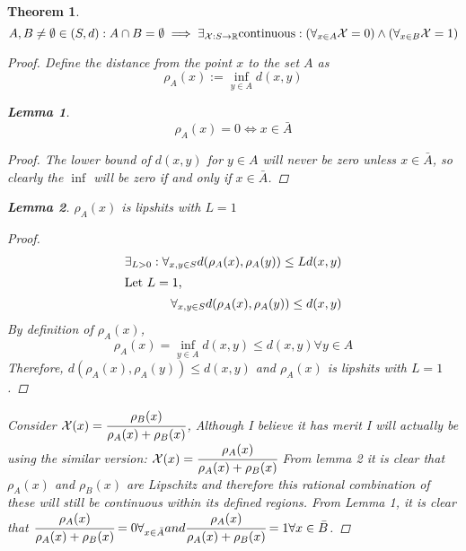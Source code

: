 \documentclass[]{article}
\newcommand{\R}{\mathbb{R}}
\newtheorem{theorem}{Theorem}
\newtheorem{lemma}{Lemma}
\begin{document}
\begin{theorem}
    $$A, B \neq \emptyset \in (S,d) : A \cap B = \emptyset \implies \exists_{\mathcal{X}: S \to \R} \textnormal{continuous} : \qty( \forall_{x \in A} \mathcal{X} = 0) \land \qty(\forall_{x \in B} \mathcal{X} = 1)$$
    \begin{proof}
        Define the distance from the point $x$ to the set $A$ as 
        $$\rho_A(x) := \inf_{y\in A} d(x,y)$$
        \begin{lemma}
            $$\rho_A(x) = 0 \iff x \in \bar{A}$$ %
            \begin{proof}
                The lower bound of $d(x,y)$ for $y\in A$ will never be zero unless $x \in \bar{A}$, so clearly the $\inf$ will be zero if and only if $x \in \bar{A}$.
            \end{proof}
        \end{lemma}
        \begin{lemma}
            $\rho_A(x)$ is lipshits with $L = 1$
            \begin{proof}
                \begin{align*}
                    \exists_{L>0} : \forall_{x,y \in S} d(\rho_A(x),\rho_A(y)) \leq L d(x,y)\\
                    \intertext{Let $L=1$,}
                    \forall_{x,y \in S} d(\rho_A(x),\rho_A(y)) \leq d(x,y)\\
                \end{align*}
                By definition of $\rho_A(x)$,
                $$\rho_A(x) = \inf_{y\in A} d(x,y) \leq d(x,y) \forall y \in A$$
                Therefore, $d(\rho_A(x),\rho_A(y)) \leq d(x,y)$ and $\rho_A(x)$ is lipshits with $L=1$.
            \end{proof}
        \end{lemma}
        Consider $\mathcal{X}(x) = \cfrac{\rho_B(x)}{\rho_A(x) + \rho_B(x)}$,
        Although I believe it has merit I will actually be using the similar version: 
        $\mathcal{X}(x) = \cfrac{\rho_A(x)}{\rho_A(x) + \rho_B(x)}$
        From lemma 2 it is clear that $\rho_A(x)$ and $\rho_B(x)$ are Lipschitz and therefore this rational combination of these will still be continuous within its defined regions.
        From Lemma 1, it is clear that  $\cfrac{\rho_A(x)}{\rho_A(x) + \rho_B(x)} = 0 \forall_{x\in \bar{A}} and \cfrac{\rho_A(x)}{\rho_A(x) + \rho_B(x)} = 1 \forall x \in \bar{B}$.
    \end{proof}
\end{theorem}
\end{document}
